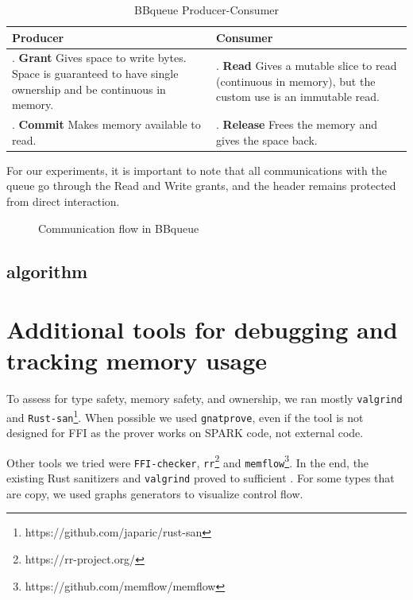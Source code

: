 \documentclass[nomenclature, english, bibtex]{kththesis}
\begin{document}
\begin{table}[ht!]
\footnotesize
\centering
\caption{BBqueue Producer-Consumer}
\label{tab:bbqueue}
\begin{tabular}{ |>{\centering\arraybackslash}m{5cm}|>{\centering\arraybackslash}m{5cm}| }
\hline
\rowcolor{color1bg!20}
Producer & Consumer \\
\hline
1. \textbf{Grant} \newline Gives space to write bytes. Space is guaranteed to have single ownership and be continuous in memory. & 3. \textbf{Read} \newline Gives a mutable slice to read (continuous in memory), but the custom use is an immutable read. \\
\hline
2. \textbf{Commit} \newline Makes memory available to read. & 4. \textbf{Release} \newline Frees the memory and gives the space back. \\
\hline
\end{tabular}
\end{table}
For our experiments, it is important to note that all communications with the queue go through the Read and Write grants, and the header remains protected from direct interaction. 

\begin{figure}[ht!]
  \centering 

\caption{Communication flow in BBqueue}
\end{figure}

\subsection{algorithm}



\section{Additional tools for debugging and tracking memory usage}

To assess for type safety, memory safety, and ownership, we ran mostly \texttt{valgrind} and \texttt{Rust-san}\footnote{https://github.com/japaric/rust-san}.
When possible we used \texttt{gnatprove}, even if the tool is not designed for FFI as the prover works on SPARK code, not external code.

Other tools we tried were \texttt{FFI-checker}\cite{li_detecting_2022}, \texttt{rr}\footnote{https://rr-project.org/} and \texttt{memflow}\footnote{https://github.com/memflow/memflow}. In the end, the existing Rust sanitizers and \texttt{valgrind} proved to sufficient .
For some types that are copy, we used graphs generators to visualize control flow.
\end{document}
